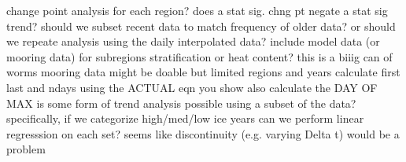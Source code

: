 \markdownRendererDocumentBegin
\markdownRendererUlBeginTight
\markdownRendererUlItem change point analysis for each region?\markdownRendererInterblockSeparator
{}\markdownRendererUlBeginTight
\markdownRendererUlItem does a stat sig. chng pt negate a stat sig trend?\markdownRendererUlItemEnd 
\markdownRendererUlEndTight \markdownRendererUlItemEnd 
\markdownRendererUlItem should we subset recent data to match frequency of older data? or should we repeate analysis using the daily interpolated data?\markdownRendererUlItemEnd 
\markdownRendererUlItem include model data (or mooring data) for subregions stratification or heat content? this is a biiig can of worms\markdownRendererUlItemEnd 
\markdownRendererUlItem mooring data might be doable but limited regions and years\markdownRendererUlItemEnd 
\markdownRendererUlItem calculate first last and ndays using the ACTUAL eqn you show\markdownRendererUlItemEnd 
\markdownRendererUlItem also calculate the DAY OF MAX\markdownRendererUlItemEnd 
\markdownRendererUlItem is some form of trend analysis possible using a subset of the data?\markdownRendererInterblockSeparator
{}\markdownRendererUlBeginTight
\markdownRendererUlItem specifically, if we categorize high/med/low ice years can we perform linear regresssion on each set?\markdownRendererUlItemEnd 
\markdownRendererUlItem seems like discontinuity (e.g. varying \markdownRendererDollarSign{}\markdownRendererBackslash{}Delta t\markdownRendererDollarSign{}) would be a problem\markdownRendererUlItemEnd 
\markdownRendererUlEndTight \markdownRendererUlItemEnd 
\markdownRendererUlEndTight \markdownRendererDocumentEnd